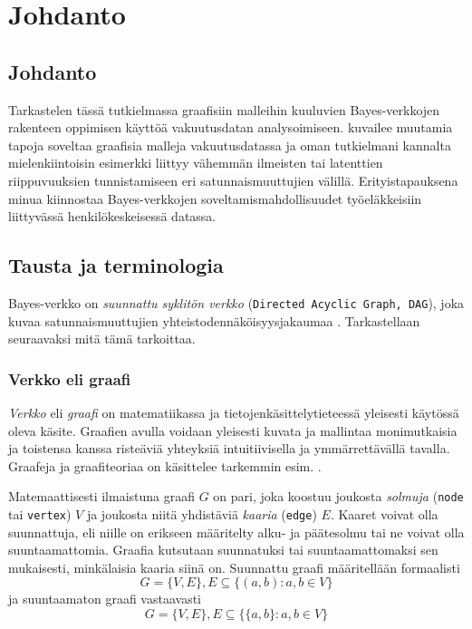 \chapter{Johdanto\label{intro}}

\section{Johdanto}
Tarkastelen tässä tutkielmassa graafisiin malleihin kuuluvien Bayes-verkkojen rakenteen oppimisen käyttöä vakuutusdatan analysoimiseen. \citet{ramsahai_connecting_2020} kuvailee muutamia tapoja soveltaa graafisia malleja vakuutusdatassa ja oman tutkielmani kannalta mielenkiintoisin esimerkki liittyy vähemmän ilmeisten tai latenttien riippuvuuksien tunnistamiseen eri satunnaismuuttujien välillä. Erityistapauksena minua kiinnostaa Bayes-verkkojen soveltamismahdollisuudet työeläkkeisiin liittyvässä henkilökeskeisessä datassa.

\section{Tausta ja terminologia}
Bayes-verkko on \emph{suunnattu syklitön verkko} (\texttt{Directed Acyclic Graph, DAG}), joka kuvaa satunnaismuuttujien yhteistodennäköisyysjakaumaa \citep{ruggeri_bayesian_2008}. Tarkastellaan seuraavaksi mitä tämä tarkoittaa.

\subsection{Verkko eli graafi}
\emph{Verkko} eli \emph{graafi} on matematiikassa ja tietojenkäsittelytieteessä yleisesti käytössä oleva käsite. Graafien avulla voidaan yleisesti kuvata ja mallintaa monimutkaisia ja toistensa kanssa risteäviä yhteyksiä intuitiivisella ja ymmärrettävällä tavalla. Graafeja ja graafiteoriaa on käsittelee tarkemmin esim. \citet{diestel_graph_2017}.

Matemaattisesti ilmaistuna graafi $G$ on pari, joka koostuu joukosta \emph{solmuja} (\texttt{node} tai \texttt{vertex}) $V$ ja joukosta niitä yhdistäviä \emph{kaaria} (\texttt{edge}) $E$. Kaaret voivat olla suunnattuja, eli niille on erikseen määritelty alku- ja päätesolmu tai ne voivat olla suuntaamattomia. Graafia kutsutaan suunnatuksi tai suuntaamattomaksi sen mukaisesti, minkälaisia kaaria siinä on. Suunnattu graafi määritellään formaalisti 
$$
    G = \{V, E\}, E \subseteq \{(a,b) : a,b \in V \}
$$
ja suuntaamaton graafi vastaavasti
$$
    G = \{V, E\}, E \subseteq \{\{a,b\} : a,b \in V \}
$$

